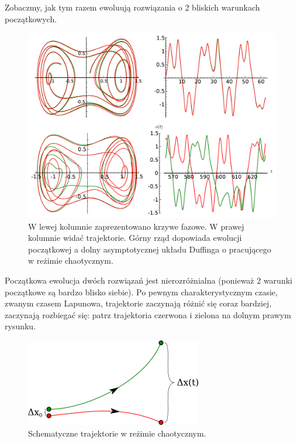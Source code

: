 \documentclass[a4paper,12pt,polish]{sphinxmanual}
\begin{document}
Zobaczmy, jak tym razem ewoluują rozwiązania o 2 bliskich warunkach początkowych.
\begin{figure}[htbp]
\centering
\capstart

\includegraphics{sage_chII011_11.pdf}
\caption{W lewej kolumnie zaprezentowano krzywe fazowe.
W prawej kolumnie widać trajektorie.
Górny rząd dopowiada ewolucji początkowej a dolny
asymptotycznej układu Duffinga o pracującego w
reżimie chaotycznym.}\end{figure}

Początkowa ewolucja dwóch rozwiązań jest nierozróżnialna (ponieważ 2 warunki początkowe są bardzo blisko siebie). Po pewnym charakterystycznym czasie, zwanym czasem Lapunowa, trajektorie zaczynają różnić się coraz bardziej, zaczynają rozbiegać się: patrz trajektoria czerwona i zielona na dolnym prawym rysunku.
\begin{figure}[htbp]
\centering
\capstart

\includegraphics{chaos_traj.png}
\caption{Schematyczne trajektorie w reżimie chaotycznym.}\end{figure}
\end{document}

